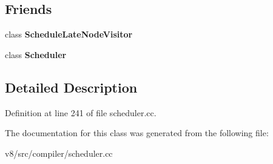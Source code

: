 \subsection*{Friends}
\begin{DoxyCompactItemize}
\item 
\mbox{\label{classv8_1_1internal_1_1compiler_1_1CFGBuilder_a1323738e293e91819df22cb24f986016}} 
class {\bfseries Schedule\+Late\+Node\+Visitor}
\item 
\mbox{\label{classv8_1_1internal_1_1compiler_1_1CFGBuilder_afb88c77ea5daaefa6c8fa6bc5b9aa5c1}} 
class {\bfseries Scheduler}
\end{DoxyCompactItemize}


\subsection{Detailed Description}


Definition at line 241 of file scheduler.\+cc.



The documentation for this class was generated from the following file\+:\begin{DoxyCompactItemize}
\item 
v8/src/compiler/scheduler.\+cc\end{DoxyCompactItemize}
